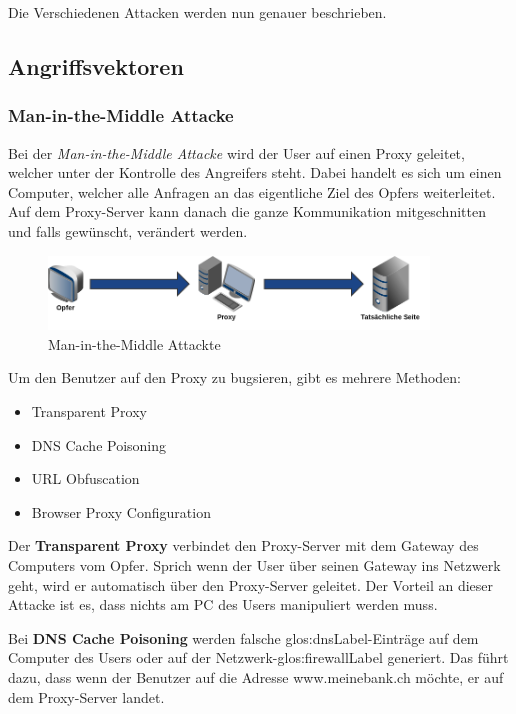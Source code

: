 Die Verschiedenen Attacken werden nun genauer beschrieben.

\subsection{Angriffsvektoren}

\subsubsection{Man-in-the-Middle Attacke}
Bei der \textit{Man-in-the-Middle Attacke} wird der User auf einen Proxy geleitet, welcher unter der Kontrolle des Angreifers steht. Dabei handelt es sich um einen Computer, welcher alle Anfragen an das eigentliche Ziel des Opfers weiterleitet. Auf dem Proxy-Server kann danach die ganze Kommunikation mitgeschnitten und falls gewünscht, verändert werden.

\begin{figure}[H]
  \centering
  \includegraphics[width=0.9\textwidth]{images/man-in-the-middle-attacke.png}
  \caption{Man-in-the-Middle Attackte}
  \label{fig:phishing:angriffvorbereiten:attacken:maninthemiddleattacke}
\end{figure}

Um den Benutzer auf den Proxy zu bugsieren, gibt es mehrere Methoden:
\begin{itemize}
\item Transparent Proxy
\item DNS Cache Poisoning
\item URL Obfuscation
\item Browser Proxy Configuration
\end{itemize}

Der \textbf{Transparent Proxy} verbindet den Proxy-Server mit dem Gateway des Computers vom Opfer. Sprich wenn der User über seinen Gateway ins Netzwerk geht, wird er automatisch über den Proxy-Server geleitet. Der Vorteil an dieser Attacke ist es, dass nichts am PC des Users manipuliert werden muss.

Bei \textbf{DNS Cache Poisoning} werden falsche \gls{glos:dnsLabel}-Einträge auf dem Computer des Users oder auf der Netzwerk-\gls{glos:firewallLabel} generiert. Das führt dazu, dass wenn der Benutzer auf die Adresse www.meinebank.ch möchte, er auf dem Proxy-Server landet.

